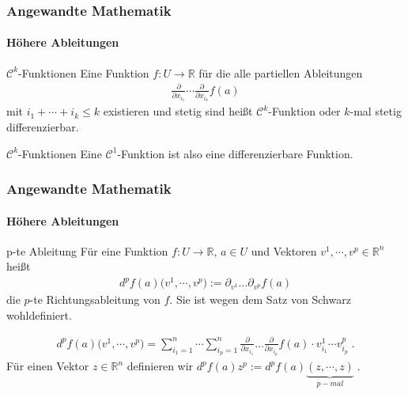 \documentclass{beamer}
\begin{document}
\begin{frame}
    \frametitle{Angewandte Mathematik}
\framesubtitle{Höhere Ableitungen}
    \begin{block}{$\mathcal{C}^k$-Funktionen}
Eine  Funktion  $f: U \to \mathbb{R}$ für die alle partiellen Ableitungen 
\begin{align*}
 \frac{\partial}{\partial x_{i_1}} \cdots   \frac{\partial}{\partial x_{i_k}} f(a)
\end{align*}
mit $i_1 + \cdots + i_k \leq k$ existieren und stetig sind heißt $\mathcal{C}^k$-Funktion oder $k$-mal stetig differenzierbar.
\end{block}
    \begin{block}{$\mathcal{C}^k$-Funktionen}
 Eine  $\mathcal{C}^1$-Funktion ist also eine differenzierbare Funktion.
\end{block}
 \end{frame}


\begin{frame}
    \frametitle{Angewandte Mathematik}
\framesubtitle{Höhere Ableitungen}
    \begin{block}{p-te Ableitung}
Für  eine Funktion  $f: U \to \mathbb{R}$, $a \in U$ und Vektoren $v^1, \cdots , v^p \in \mathbb{R}^n$ heißt 
\begin{align*}
d^pf(a) \bigl(v^1, \cdots , v^p  ) := \partial_{v^1} \hdots \partial_{v^p} f(a)
\end{align*}
die $p$-te Richtungsableitung von $f$. Sie ist wegen dem Satz von Schwarz wohldefiniert.

\end{block}
    \begin{block}{}
\begin{align*}
d^pf(a) \bigl(v^1, \cdots , v^p  ) = \sum_{i_1 = 1}^n \cdots \sum_{i_p = 1}^n  \frac{\partial}{\partial x_{i_1}} \hdots \frac{\partial}{\partial x_{i_p}} f(a) \cdot v^1_{i_1} \cdots v^p_{i_p} \; .
\end{align*}
Für einen Vektor $z \in \mathbb{R}^n$ definieren wir $d^pf(a) z^p := d^pf(a) \underbrace{(z, \cdots , z)}_{p-mal} \;.$

\end{block}
 \end{frame}
\end{document}
